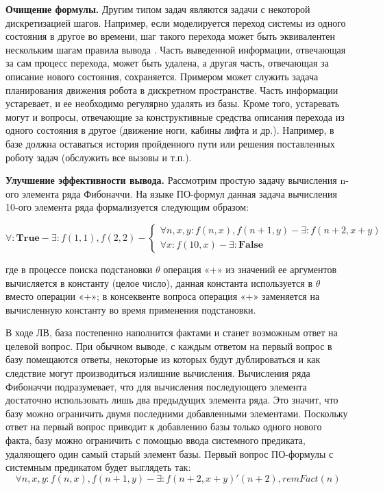 \textbf{Очищение формулы.} Другим типом задач являются задачи с некоторой дискретизацией шагов. Например, если моделируется переход системы из одного состояния в другое во времени, шаг такого перехода может быть эквивалентен нескольким шагам правила вывода . Часть выведенной информации, отвечающая за сам процесс перехода, может быть удалена, а другая часть, отвечающая за описание нового состояния, сохраняется. Примером может служить задача планирования движения робота в дискретном пространстве. Часть информации устаревает, и ее необходимо регулярно удалять из базы. Кроме того, устаревать могут и вопросы, отвечающие за конструктивные средства описания перехода из одного состояния в другое (движение ноги, кабины лифта и др.). Например, в базе должна оставаться история пройденного пути или решения поставленных роботу задач (обслужить все вызовы и т.п.). 

\textbf{Улучшение эффективности вывода.} Рассмотрим простую задачу вычисления n-ого элемента ряда Фибоначчи. На языке ПО-формул данная задача вычисления 10-ого элемента ряда формализуется следующим образом:

\begin{equation}
	\forall\colon\boldsymbol{True} - \exists\colon f(1,1), f(2,2) - 
	\left\lbrace
	\begin{array}{l}
		\forall n,x,y\colon f(n,x),f(n+1,y) - \exists\colon f(n+2,x+y) \\
		\forall x\colon f(10,x) - \exists\colon \boldsymbol{False} 
	\end{array}\right.
\end{equation}

где в процессе поиска подстановки $\theta$ операция «+» из значений ее аргументов вычисляется в константу (целое число), данная константа используется в $\theta$ вместо операции «+»; в консеквенте вопроса операция «+» заменяется на вычисленную константу во время применения подстановки.

В ходе ЛВ, база постепенно наполнится фактами и станет возможным ответ на целевой вопрос. При обычном выводе, с каждым ответом на первый вопрос в базу помещаются ответы, некоторые из которых будут дублироваться и как следствие могут производиться излишние вычисления. Вычисления ряда Фибоначчи подразумевает, что для вычисления последующего элемента достаточно использовать лишь два предыдущих элемента ряда. Это значит, что базу можно ограничить двумя последними добавленными элементами. Поскольку ответ на первый вопрос приводит к добавлению базы только одного нового факта, базу можно ограничить с помощью ввода системного предиката, удаляющего один самый старый элемент базы. Первый вопрос ПО-формулы с системным предикатом будет выглядеть так:
\begin{equation}
	\forall n,x,y\colon f(n,x),f(n+1,y) - \exists\colon f(n+2,x+y)'(n+2), remFact(n)
\end{equation}

